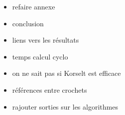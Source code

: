 \begin{itemize}
	\item refaire annexe
	\item conclusion
	\item liens vers les résultats
	\item temps calcul cyclo
	\item on ne sait pas si Korselt est efficace
	\item références entre crochets
	\item rajouter sorties sur les algorithmes
\end{itemize}
